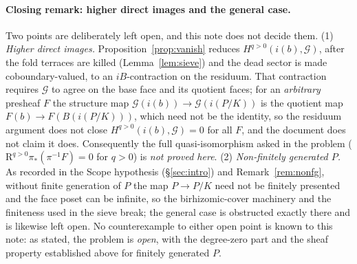 \documentclass[11pt]{article}
\theoremstyle{definition}
\begin{document}
\paragraph{Closing remark: higher direct images and the general
case.} Two points are deliberately left open, and this note does not
decide them. \textup{(}1\textup{)} \emph{Higher direct images.}
Proposition~\ref{prop:vanish} reduces $H^{q>0}(i(b),\mathcal G)$,
after the fold terraces are killed (Lemma~\ref{lem:sieve}) and the
dead sector is made coboundary-valued, to an $iB$-contraction on the
residuum. That contraction requires $\mathcal G$ to agree on the base
face and its quotient faces; for an \emph{arbitrary} presheaf $F$ the
structure map $\mathcal G(i(b))\to\mathcal G(i(P/K))$ is the quotient
map $F(b)\to F(B(i(P/K)))$, which need not be the identity, so the
residuum argument does not close $H^{q>0}(i(b),\mathcal G)=0$ for all
$F$, and the document does not claim it does. Consequently the full
quasi-isomorphism asked in the problem
\textup{(}$\mathrm R^{q>0}\pi_*(\pi^{-1}F)=0$ for $q>0$\textup{)} is
\emph{not proved here}. \textup{(}2\textup{)} \emph{Non-finitely
generated $P$.} As recorded in the Scope hypothesis
\textup{(}\S\ref{sec:intro}\textup{)} and Remark~\ref{rem:nonfg},
without finite generation of $P$ the map $P\to P/K$ need not be
finitely presented and the face poset can be infinite, so the
birhizomic-cover machinery and the finiteness used in the sieve
break; the general case is obstructed exactly there and is likewise
left open. No counterexample to either open point is known to this
note: as stated, the problem is \emph{open}, with the degree-zero
part and the sheaf property established above for finitely generated
$P$.
\end{document}
